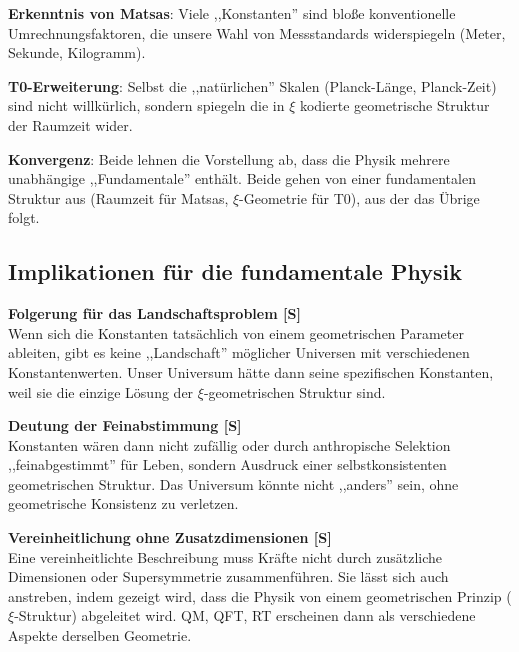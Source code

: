 	\textbf{Erkenntnis von Matsas}: Viele ,,Konstanten'' sind bloße konventionelle Umrechnungsfaktoren, die unsere Wahl von Messstandards widerspiegeln (Meter, Sekunde, Kilogramm).
	
	\textbf{T0-Erweiterung}: Selbst die ,,natürlichen'' Skalen (Planck-Länge, Planck-Zeit) sind nicht willkürlich, sondern spiegeln die in $\xi$ kodierte geometrische Struktur der Raumzeit wider.
	
	\textbf{Konvergenz}: Beide lehnen die Vorstellung ab, dass die Physik mehrere unabhängige ,,Fundamentale'' enthält. Beide gehen von einer fundamentalen Struktur aus (Raumzeit für Matsas, $\xi$-Geometrie für T0), aus der das Übrige folgt.
	
	\subsection{Implikationen für die fundamentale Physik}
	
	\begin{insight}
		\textbf{Folgerung für das Landschaftsproblem [S]}\\
		Wenn sich die Konstanten tatsächlich von einem geometrischen Parameter ableiten, gibt es keine ,,Landschaft'' möglicher Universen mit verschiedenen Konstantenwerten. Unser Universum hätte dann seine spezifischen Konstanten, weil sie die einzige Lösung der $\xi$-geometrischen Struktur sind.
	\end{insight}
	
	\begin{insight}
		\textbf{Deutung der Feinabstimmung [S]}\\
		Konstanten wären dann nicht zufällig oder durch anthropische Selektion ,,feinabgestimmt'' für Leben, sondern Ausdruck einer selbstkonsistenten geometrischen Struktur. Das Universum könnte nicht ,,anders'' sein, ohne geometrische Konsistenz zu verletzen.
	\end{insight}
	
	\begin{insight}
		\textbf{Vereinheitlichung ohne Zusatzdimensionen [S]}\\
		Eine vereinheitlichte Beschreibung muss Kräfte nicht durch zusätzliche Dimensionen oder Supersymmetrie zusammenführen. Sie lässt sich auch anstreben, indem gezeigt wird, dass die Physik von einem geometrischen Prinzip ($\xi$-Struktur) abgeleitet wird. QM, QFT, RT erscheinen dann als verschiedene Aspekte derselben Geometrie.
	\end{insight}
	
